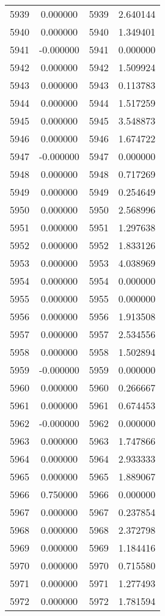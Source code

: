 \documentclass[12pt]{article}
\begin{document}
\begin{longtable}{@{}cccc@{}}
5939 & 0.000000 & 5939 & 2.640144 \\
5940 & 0.000000 & 5940 & 1.349401 \\
5941 & -0.000000 & 5941 & 0.000000 \\
5942 & 0.000000 & 5942 & 1.509924 \\
5943 & 0.000000 & 5943 & 0.113783 \\
5944 & 0.000000 & 5944 & 1.517259 \\
5945 & 0.000000 & 5945 & 3.548873 \\
5946 & 0.000000 & 5946 & 1.674722 \\
5947 & -0.000000 & 5947 & 0.000000 \\
5948 & 0.000000 & 5948 & 0.717269 \\
5949 & 0.000000 & 5949 & 0.254649 \\
5950 & 0.000000 & 5950 & 2.568996 \\
5951 & 0.000000 & 5951 & 1.297638 \\
5952 & 0.000000 & 5952 & 1.833126 \\
5953 & 0.000000 & 5953 & 4.038969 \\
5954 & 0.000000 & 5954 & 0.000000 \\
5955 & 0.000000 & 5955 & 0.000000 \\
5956 & 0.000000 & 5956 & 1.913508 \\
5957 & 0.000000 & 5957 & 2.534556 \\
5958 & 0.000000 & 5958 & 1.502894 \\
5959 & -0.000000 & 5959 & 0.000000 \\
5960 & 0.000000 & 5960 & 0.266667 \\
5961 & 0.000000 & 5961 & 0.674453 \\
5962 & -0.000000 & 5962 & 0.000000 \\
5963 & 0.000000 & 5963 & 1.747866 \\
5964 & 0.000000 & 5964 & 2.933333 \\
5965 & 0.000000 & 5965 & 1.889067 \\
5966 & 0.750000 & 5966 & 0.000000 \\
5967 & 0.000000 & 5967 & 0.237854 \\
5968 & 0.000000 & 5968 & 2.372798 \\
5969 & 0.000000 & 5969 & 1.184416 \\
5970 & 0.000000 & 5970 & 0.715580 \\
5971 & 0.000000 & 5971 & 1.277493 \\
5972 & 0.000000 & 5972 & 1.781594 \\

\end{longtable}
\end{document}

